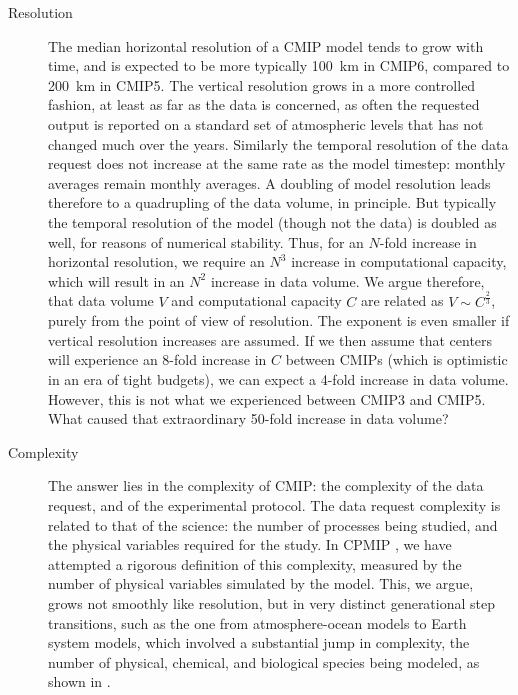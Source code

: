 \documentclass[gmd,manuscript]{copernicus}
\newcommand{\bibref}[1] { \cite{ref:#1}}
\newcommand{\pipref}[1] {\citep{ref:#1}}
\begin{document}
\begin{description}
\item[Resolution] The median horizontal resolution of a CMIP model
  tends to grow with time, and is expected to be more typically 100~km
  in CMIP6, compared to 200~km in CMIP5. The vertical resolution grows
  in a more controlled fashion, at least as far as the data is
  concerned, as often the requested output is reported on a standard
  set of atmospheric levels that has not changed much over the years.
  Similarly the temporal resolution of the data request does not
  increase at the same rate as the model timestep: monthly averages
  remain monthly averages. A doubling of model resolution leads
  therefore to a quadrupling of the data volume, in principle. But
  typically the temporal resolution of the model (though not the data)
  is doubled as well, for reasons of numerical stability. Thus, for an
  $N$-fold increase in horizontal resolution, we require an $N^3$
  increase in computational capacity, which will result in an $N^2$
  increase in data volume. We argue therefore, that data volume $V$
  and computational capacity $C$ are related as $V \sim C^\frac23$,
  purely from the point of view of resolution. The exponent is even
  smaller if vertical resolution increases are assumed. If we then
  assume that centers will experience an 8-fold increase in $C$
  between CMIPs (which is optimistic in an era of tight budgets), we
  can expect a 4-fold increase in data volume. However, this is not
  what we experienced between CMIP3 and CMIP5. What caused that
  extraordinary 50-fold increase in data volume?
\item[Complexity] The answer lies in the complexity of CMIP: the
  complexity of the data request, and of the experimental protocol.
  The data request complexity is related to that of the science: the
  number of processes being studied, and the physical variables
  required for the study. In CPMIP \pipref{balajietal2017}, we have
  attempted a rigorous definition of this complexity, measured
  by the number of physical variables simulated by the model. This, we
  argue, grows not smoothly like resolution, but in very distinct
  generational step transitions, such as the one from
  atmosphere-ocean models to Earth system models, which involved a
  substantial jump in complexity, the number of physical, chemical,
  and biological species being modeled, as shown in
  \bibref{balajietal2017}.


\end{description}
\end{document}

